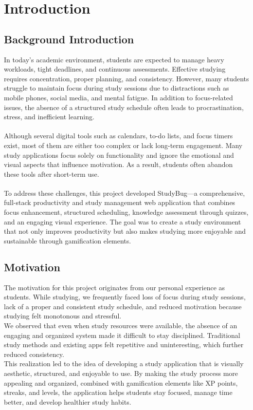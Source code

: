      \chapter{Introduction}
        \section{Background Introduction}
        In today's academic environment, students are expected to manage heavy workloads, tight deadlines, and continuous assessments. Effective studying requires concentration, proper planning, and consistency. However, many students struggle to maintain focus during study sessions due to distractions such as mobile phones, social media, and mental fatigue. In addition to focus-related issues, the absence of a structured study schedule often leads to procrastination, stress, and inefficient learning. \\
            \\
            Although several digital tools such as calendars, to-do lists, and focus timers exist, most of them are either too complex or lack long-term engagement. Many study applications focus solely on functionality and ignore the emotional and visual aspects that influence motivation. As a result, students often abandon these tools after short-term use. \\
            \\
            To address these challenges, this project developed StudyBug---a comprehensive, full-stack productivity and study management web application that combines focus enhancement, structured scheduling, knowledge assessment through quizzes, and an engaging visual experience. The goal was to create a study environment that not only improves productivity but also makes studying more enjoyable and sustainable through gamification elements.

        \section{Motivation}
        The motivation for this project originates from our personal experience as students. While studying, we frequently faced loss of focus during study sessions, lack of a proper and consistent study schedule, and reduced motivation because studying felt monotonous and stressful.
            \\
            We observed that even when study resources were available, the absence of an engaging and organized system made it difficult to stay disciplined. Traditional study methods and existing apps felt repetitive and uninteresting, which further reduced consistency.
            \\
            This realization led to the idea of developing a study application that is visually aesthetic, structured, and enjoyable to use. By making the study process more appealing and organized, combined with gamification elements like XP points, streaks, and levels, the application helps students stay focused, manage time better, and develop healthier study habits.

